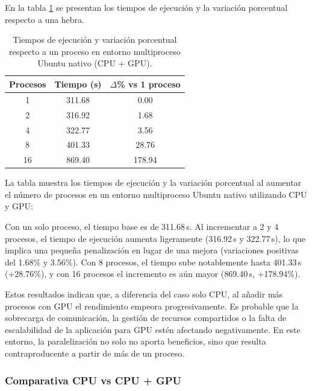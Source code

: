 En la tabla \ref{tab:multi-node_ubuntu_gpu_native} se presentan los tiempos de ejecución y la variación porcentual respecto a una hebra.

\begin{table}[ht]
    \centering
    \begin{tabular}{|c|c|c|}
        \hline
        \textbf{Procesos} & \textbf{Tiempo (s)} & \textbf{$\Delta$\% vs 1 proceso} \\
        \hline
        1                 & 311.68              & 0.00                             \\
        2                 & 316.92              & 1.68                             \\
        4                 & 322.77              & 3.56                             \\
        8                 & 401.33              & 28.76                            \\
        16                & 869.40              & 178.94                           \\
        \hline
    \end{tabular}
    \caption{Tiempos de ejecución y variación porcentual respecto a un proceso en entorno multiproceso Ubuntu nativo (CPU + GPU).}
    \label{tab:multi-node_ubuntu_gpu_native}
\end{table}

La tabla muestra los tiempos de ejecución y la variación porcentual al aumentar el número de procesos en un entorno multiproceso Ubuntu nativo utilizando CPU y GPU:

Con un solo proceso, el tiempo base es de 311.68\,s. Al incrementar a 2 y 4 procesos, el tiempo de ejecución aumenta ligeramente (316.92\,s y 322.77\,s), lo que implica una pequeña penalización en lugar de una mejora (variaciones positivas del 1.68\% y 3.56\%). Con 8 procesos, el tiempo sube notablemente hasta 401.33\,s (+28.76\%), y con 16 procesos el incremento es aún mayor (869.40\,s, +178.94\%).

Estos resultados indican que, a diferencia del caso solo CPU, al añadir más procesos con GPU el rendimiento empeora progresivamente. Es probable que la sobrecarga de comunicación, la gestión de recursos compartidos o la falta de escalabilidad de la aplicación para GPU estén afectando negativamente. En este entorno, la paralelización no solo no aporta beneficios, sino que resulta contraproducente a partir de más de un proceso.

\subsubsection{Comparativa CPU vs CPU + GPU}


